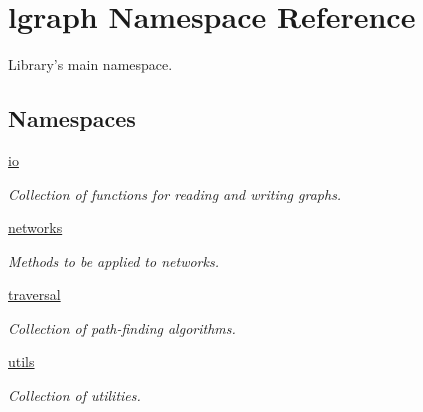 \hypertarget{namespacelgraph}{\section{lgraph Namespace Reference}
\label{namespacelgraph}
}


Library's main namespace.  


\subsection*{Namespaces}
\begin{DoxyCompactItemize}
\item 
\hyperlink{namespacelgraph_1_1io}{io}
\begin{DoxyCompactList}\small\item\em Collection of functions for reading and writing graphs. \end{DoxyCompactList}\item 
\hyperlink{namespacelgraph_1_1networks}{networks}
\begin{DoxyCompactList}\small\item\em Methods to be applied to networks. \end{DoxyCompactList}\item 
\hyperlink{namespacelgraph_1_1traversal}{traversal}
\begin{DoxyCompactList}\small\item\em Collection of path-\/finding algorithms. \end{DoxyCompactList}\item 
\hyperlink{namespacelgraph_1_1utils}{utils}
\begin{DoxyCompactList}\small\item\em Collection of utilities. \end{DoxyCompactList}\end{DoxyCompactItemize}
